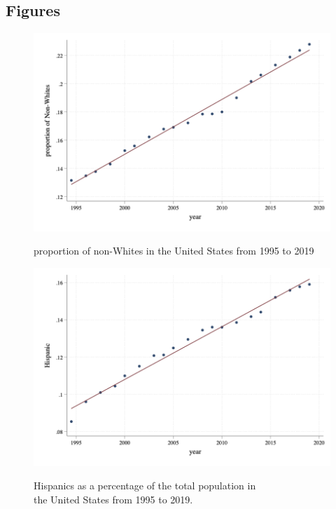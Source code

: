 \documentclass{wptemp}
\begin{document}
\pagebreak

\newpage
\pagebreak
\begin{appendices}

\section{Figures}\label{appendix:figures}

\begin{center}
\begin{figure}[H]
\caption{proportion of non-Whites in the United States from 1995 to 2019}
\includegraphics[width=\textwidth]{GraphNonWhites.png} 
\label{fig:1}
\end{figure}
\end{center}

\newpage

\begin{center}
\begin{figure}
\caption{Hispanics as a percentage of the total population in \\
the United States from 1995 to 2019.}
\includegraphics[width=\textwidth]{HispanicUSA.png} \label{fig:2}
\end{figure}
\end{center}


\end{appendices}
\end{document}
